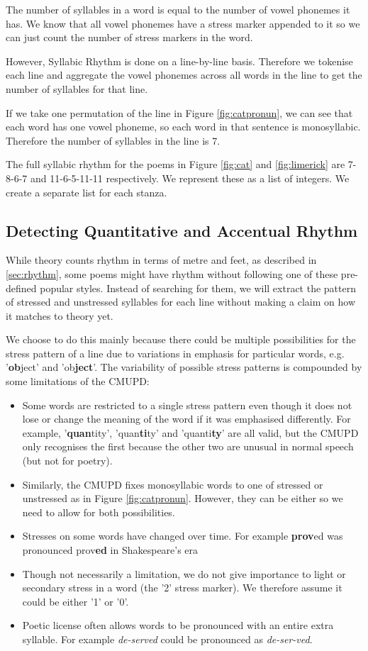 The number of syllables in a word is equal to the number of vowel phonemes it has. We know that all vowel phonemes have a stress marker appended to it so we can just count the number of stress markers in the word.

However, Syllabic Rhythm is done on a line-by-line basis. Therefore we tokenise each line and aggregate the vowel phonemes across all words in the line to get the number of syllables for that line.

If we take one permutation of the line in Figure \ref{fig:catpronun}, we can see that each word has one vowel phoneme, so each word in that sentence is monosyllabic. Therefore the number of syllables in the line is 7.

The full syllabic rhythm for the poems in Figure \ref{fig:cat} and \ref{fig:limerick} are 7-8-6-7 and 11-6-5-11-11 respectively. We represent these as a list of integers. We create a separate list for each stanza.

\subsection{Detecting Quantitative and Accentual Rhythm}

While theory counts rhythm in terms of metre and feet, as described in \ref{sec:rhythm}, some poems might have rhythm without following one of these pre-defined popular styles. Instead of searching for them, we will extract the pattern of stressed and unstressed syllables for each line without making a claim on how it matches to theory yet.

We choose to do this mainly because there could be multiple possibilities for the stress pattern of a line due to variations in emphasis for particular words, e.g. '\textbf{ob}ject' and 'ob\textbf{ject}'. The variability of possible stress patterns is compounded by some limitations of the CMUPD:
\begin{itemize}
\item{Some words are restricted to a single stress pattern even though it does not lose or change the meaning of the word if it was emphasised differently. For example, '\textbf{quan}tity', 'quan\textbf{ti}ty' and 'quanti\textbf{ty}' are all valid, but the CMUPD only recognises the first because the other two are unusual in normal speech (but not for poetry).}
\item{Similarly, the CMUPD fixes monosyllabic words to one of stressed or unstressed as in Figure \ref{fig:catpronun}. However, they can be either so we need to allow for both possibilities.}
\item{Stresses on some words have changed over time. For example \textbf{prov}ed was pronounced prov\textbf{ed} in Shakespeare's era}
\item{Though not necessarily a limitation, we do not give importance to light or secondary stress in a word (the '2' stress marker). We therefore assume it could be either '1' or '0'.}
\item{Poetic license often allows words to be pronounced with an entire extra syllable. For example \textit{de-served} could be pronounced as \textit{de-ser-ved}.}
\end{itemize}


